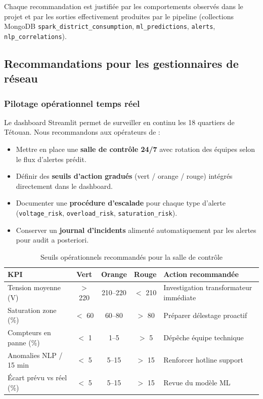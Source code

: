 \documentclass[11pt,a4paper]{article}
\begin{document}
Chaque recommandation est justifiée par les comportements observés dans le projet et par les sorties effectivement produites par le pipeline (collections MongoDB \texttt{spark\_district\_consumption}, \texttt{ml\_predictions}, \texttt{alerts}, \texttt{nlp\_correlations}).

\subsection{Recommandations pour les gestionnaires de réseau}

\subsubsection{Pilotage opérationnel temps réel}
Le dashboard Streamlit permet de surveiller en continu les 18 quartiers de Tétouan. Nous recommandons aux opérateurs de :
\begin{itemize}
  \item Mettre en place une \textbf{salle de contrôle 24/7} avec rotation des équipes selon le flux d'alertes prédit.
  \item Définir des \textbf{seuils d'action gradués} (vert / orange / rouge) intégrés directement dans le dashboard.
  \item Documenter une \textbf{procédure d'escalade} pour chaque type d'alerte (\texttt{voltage\_risk}, \texttt{overload\_risk}, \texttt{saturation\_risk}).
  \item Conserver un \textbf{journal d'incidents} alimenté automatiquement par les alertes pour audit a posteriori.
\end{itemize}

\begin{table}[h!]
\centering
\begin{tabularx}{\textwidth}{lcccY}
\toprule
{}
\textbf{KPI} & \textbf{Vert} & \textbf{Orange} & \textbf{Rouge} & \textbf{Action recommandée} \\
\midrule
Tension moyenne (V) & $>$ 220 & 210--220 & $<$ 210 & Investigation transformateur immédiate \\
Saturation zone (\%) & $<$ 60 & 60--80 & $>$ 80 & Préparer délestage proactif \\
Compteurs en panne (\%) & $<$ 1 & 1--5 & $>$ 5 & Dépêche équipe technique \\
Anomalies NLP / 15 min & $<$ 5 & 5--15 & $>$ 15 & Renforcer hotline support \\
Écart prévu vs réel (\%) & $<$ 5 & 5--15 & $>$ 15 & Revue du modèle ML \\
\bottomrule
\end{tabularx}
\caption{Seuils opérationnels recommandés pour la salle de contrôle}
\end{table}
\end{document}
